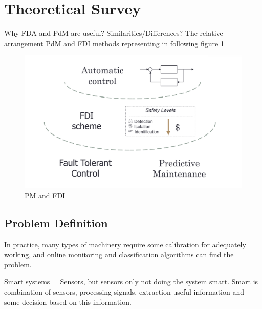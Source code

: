 \documentclass[class=article, crop=false]{standalone}
\begin{document}
\tableofcontents

% 
\section{Theoretical Survey}
Why FDA and PdM are useful? Similarities/Differences?
The relative arrangement PdM and FDI methods representing in following
figure \ref{fig:fdi_pm}
\begin{figure}[h!]
    \centering
    \includegraphics[scale=0.3]{FDI_PM.png}
    \caption{PM and FDI }
    \label{fig:fdi_pm}
\end{figure}



% 

\subsection{Problem Definition}

In practice, many types of machinery require some calibration for adequately working,
and online monitoring and classification algorithms can find the problem.



Smart systems = Sensors, but sensors only not doing the system smart. Smart
is combination of sensors, processing signals, extraction useful information and
some decision based on this information.
\end{document}
